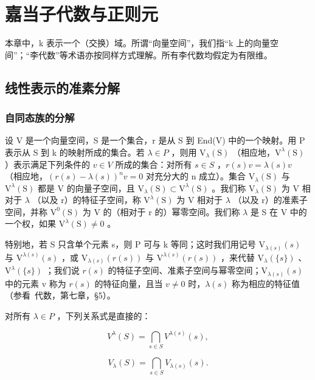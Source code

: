 \chapter{嘉当子代数与正则元}

本章中，k 表示一个（交换）域。所谓“向量空间”，我们指“k 上的向量空间”；“李代数”等术语亦按同样方式理解。所有李代数均假定为有限维。

\section{线性表示的准素分解}

\subsection{自同态族的分解}

设 V 是一个向量空间，S 是一个集合，r 是从 S 到 End(V) 中的一个映射。用 P 表示从 S 到 k 的映射所成的集合。若 \(\lambda \in P\) ，则用 \(\mathrm{V}_{\lambda}(\mathrm{S})\) （相应地，\(\mathrm{V}^{\lambda}(\mathrm{S})\) ）表示满足下列条件的 \(v \in V\) 所成的集合：对所有 \(s \in S\) ，\(r(s)v = \lambda(s)v\) （相应地，\((r(s) - \lambda(s))^{n}v = 0\) 对充分大的 n 成立）。集合 \(\mathrm{V}_{\lambda}(\mathrm{S})\) 与 \(\mathrm{V}^{\lambda}(\mathrm{S})\) 都是 V 的向量子空间，且 \(\mathrm{V}_{\lambda}(\mathrm{S}) \subset \mathrm{V}^{\lambda}(\mathrm{S})\) 。我们称 \(\mathrm{V}_{\lambda}(\mathrm{S})\) 为 V 相对于 \(\lambda\) （以及 r）的特征子空间，称 \(\mathrm{V}^{\lambda}(\mathrm{S})\) 为 V 相对于 \(\lambda\) （以及 r）的准素子空间，并称 \(\mathrm{V}^{0}(\mathrm{S})\) 为 V 的（相对于 r 的）幂零空间。我们称 \(\lambda\) 是 S 在 V 中的一个权，如果 \(\mathrm{V}^{\lambda}(\mathrm{S}) \neq 0\) 。

特别地，若 S 只含单个元素 s，则 P 可与 k 等同；这时我们用记号 \(\mathrm{V}_{\lambda(s)}(s)\) 与 \(\mathrm{V}^{\lambda(s)}(s)\) ，或 \(\mathrm{V}_{\lambda(s)}(r(s))\) 与 \(\mathrm{V}^{\lambda(s)}(r(s))\) ，来代替 \(\mathrm{V}_{\lambda}(\{s\})\) 、\(\mathrm{V}^{\lambda}(\{s\})\) ；我们说 \(r(s)\) 的特征子空间、准素子空间与幂零空间；\(\mathrm{V}_{\lambda(s)}(s)\) 中的元素 v 称为 \(r(s)\) 的特征向量，且当 \(v \neq 0\) 时，\(\lambda(s)\) 称为相应的特征值（参看~代数，第七章，§5）。

对所有 \(\lambda\in P\) ，下列关系式是直接的：

\[
V ^ {\lambda} (S) = \bigcap_ {s \in S} V ^ {\lambda (s)} (s),\tag{1}
\]

\[
V _ {\lambda} (S) = \bigcap_ {s \in S} V _ {\lambda (s)} (s).\tag{2}
\]

